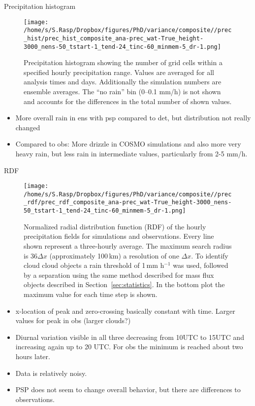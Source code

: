 \documentclass[a4paper, 12pt]{article}
\begin{document}
\newpage
Precipitation histogram
\begin{figure}[h!]
\noindent \centering
\texttt{[image: /home/s/S.Rasp/Dropbox/figures/PhD/variance/composite//prec\_hist/prec\_hist\_composite\_ana-prec\_wat-True\_height-3000\_nens-50\_tstart-1\_tend-24\_tinc-60\_minmem-5\_dr-1.png]}\\
\caption{Precipitation histogram showing the number of grid cells within a specified hourly precipitation range. Values are averaged for all analysis times and days. Additionally the simulation numbers are ensemble averages. The ``no rain'' bin (0--0.1 mm/h) is not shown and accounts for the differences in the total number of shown values.} \label{fig:prec_hist}
\end{figure}
\begin{itemize}
 \item More overall rain in ens with psp compared to det, but distribution not really changed
 \item Compared to obs: More drizzle in COSMO simulations and also more very heavy rain, but less rain in intermediate values, particularly from 2-5 mm/h. 
\end{itemize}


\newpage
RDF
\begin{figure}[h!]
\noindent \centering
\texttt{[image: /home/s/S.Rasp/Dropbox/figures/PhD/variance/composite//prec\_rdf/prec\_rdf\_composite\_ana-prec\_wat-True\_height-3000\_nens-50\_tstart-1\_tend-24\_tinc-60\_minmem-5\_dr-1.png]}\\
\caption{Normalized radial distribution function (RDF) of the hourly precipitation fields for simulations and observations. Every line shown represent a three-hourly average. The maximum search radius is 36$\Delta x$ (approximately 100\,km) a resolution of one $\Delta x$. To identify cloud cloud objects a rain threshold of 1\,mm h$^{-1}$ was used, followed by a separation using the same method described for mass flux objects described in Section~\ref{sec:statistics}. In the bottom plot the maximum value for each time step is shown.} \label{fig:prec_rdf}
\end{figure}
\begin{itemize}
 \item x-location of peak and zero-crossing basically constant with time. Larger values for peak in obs (larger clouds?)
 \item Diurnal variation visible in all three decreasing from 10UTC to 15UTC and increasing again up to 20 UTC. For obs the minimum is reached about two hours later. 
 \item Data is relatively noisy. 
 \item PSP does not seem to change overall behavior, but there are differences to observations. 
\end{itemize}
\end{document}
